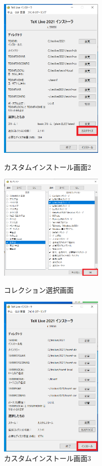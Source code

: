\documentclass[dvipdfmx]{jsarticle}
\begin{document}
\begin{figure}[H]
    \begin{minipage}[b]{0.33\linewidth}
        \centering
        \includegraphics[width=5cm]{images/TeXLive2021_5.png}
        \caption{カスタムインストール画面2}
    \end{minipage}
    \begin{minipage}[b]{0.33\linewidth}
        \centering
        \includegraphics[width=5cm]{images/TeXLive2021_6.png}
        \caption{コレクション選択画面}
    \end{minipage}
    \begin{minipage}[b]{0.33\linewidth}
        \centering
        \includegraphics[width=5cm]{images/TeXLive2021_7.png}
        \caption{カスタムインストール画面3}
    \end{minipage}
\end{figure}
\end{document}
